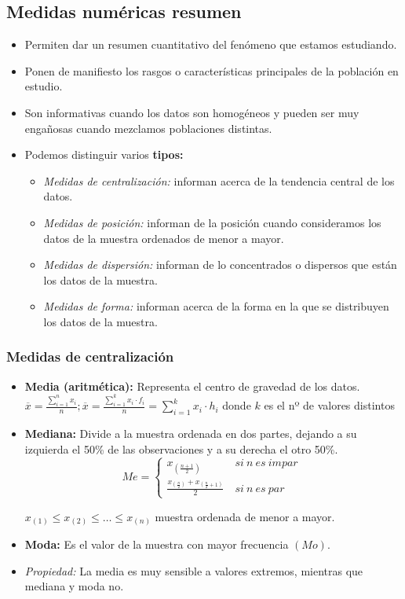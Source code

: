 \subsection{Medidas numéricas resumen}
\begin{itemize}
	\item Permiten dar un resumen cuantitativo del fenómeno que estamos estudiando.
	\item Ponen de manifiesto los rasgos o características principales de la población en estudio.
	\item Son informativas cuando los datos son homogéneos y pueden ser muy engañosas cuando mezclamos poblaciones distintas.
	\item Podemos distinguir varios \textbf{tipos:}
	\begin{itemize}
		\item \textit{Medidas de centralización:} informan acerca de la tendencia central de los datos.
		\item \textit{Medidas de posición:} informan de la posición cuando consideramos los datos de la muestra ordenados de menor a mayor.
		\item \textit{Medidas de dispersión:} informan de lo concentrados o dispersos que están los datos de la muestra.
		\item \textit{Medidas de forma:} informan acerca de la forma en la que se distribuyen los datos de la muestra.
	\end{itemize}
\end{itemize}
\subsubsection{Medidas de centralización}
\begin{itemize}
	\item \textbf{Media (aritmética):} Representa el centro de gravedad de los datos.\\ $\overline{x}=\frac{\displaystyle \sum_{i=1}^{n}{x_{i}}}{n}; \overline{x}=\frac{\displaystyle \sum_{i=1}^{k}{x_{i}\cdot f_{i}}}{n}=\displaystyle \sum_{i=1}^{k}{x_{i} \cdot h_{i}}$ donde $k$ es el nº de valores distintos
	\item \textbf{Mediana:} Divide a la muestra ordenada en dos partes, dejando a su izquierda el 50\% de las observaciones y a su derecha el otro 50\%. $$Me=\left\lbrace\begin{array}{cl} x_{(\frac{n+1}{2})} & ~si~ n ~es~impar~\\ \frac{x_{(\frac{n}{2})}+x_{(\frac{n}{2}+1)}}{2} & ~si~ n ~es~par~\end{array}\right.$$
	\begin{center}$x_{(1)} \le x_{(2)} \le \hdots \le x_{(n)}$ muestra ordenada de menor a mayor.\end{center}
	\item \textbf{Moda:} Es el valor de la muestra con mayor frecuencia $(Mo)$.
	\item \textit{Propiedad:} La media es muy sensible a valores extremos, mientras que mediana y moda no.
\end{itemize}
